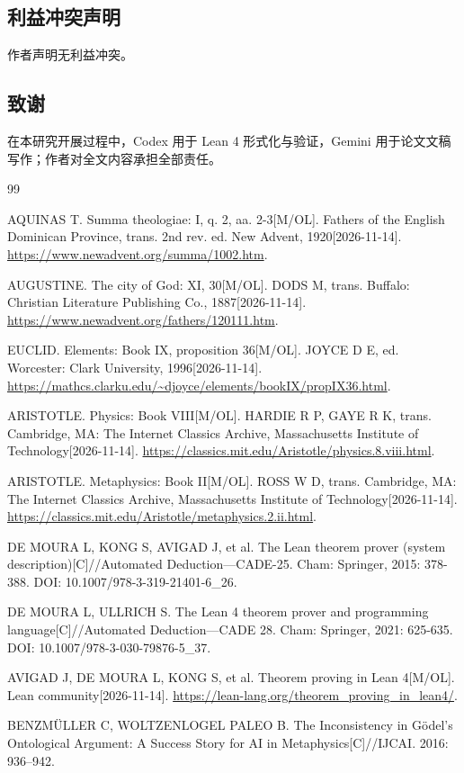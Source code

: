 \documentclass[11pt,a4paper]{ctexart}
\begin{document}
\subsection*{利益冲突声明}
作者声明无利益冲突。

\subsection*{致谢}
在本研究开展过程中，Codex 用于 Lean 4 形式化与验证，Gemini 用于论文文稿写作；作者对全文内容承担全部责任。

\begin{thebibliography}{99}

AQUINAS T. Summa theologiae: I, q. 2, aa. 2-3[M/OL]. Fathers of the English Dominican Province, trans. 2nd rev. ed. New Advent, 1920[2026-11-14]. \url{https://www.newadvent.org/summa/1002.htm}.

AUGUSTINE. The city of God: XI, 30[M/OL]. DODS M, trans. Buffalo: Christian Literature Publishing Co., 1887[2026-11-14]. \url{https://www.newadvent.org/fathers/120111.htm}.

EUCLID. Elements: Book IX, proposition 36[M/OL]. JOYCE D E, ed. Worcester: Clark University, 1996[2026-11-14]. \url{https://mathcs.clarku.edu/~djoyce/elements/bookIX/propIX36.html}.

ARISTOTLE. Physics: Book VIII[M/OL]. HARDIE R P, GAYE R K, trans. Cambridge, MA: The Internet Classics Archive, Massachusetts Institute of Technology[2026-11-14]. \url{https://classics.mit.edu/Aristotle/physics.8.viii.html}.

ARISTOTLE. Metaphysics: Book II[M/OL]. ROSS W D, trans. Cambridge, MA: The Internet Classics Archive, Massachusetts Institute of Technology[2026-11-14]. \url{https://classics.mit.edu/Aristotle/metaphysics.2.ii.html}.

DE MOURA L, KONG S, AVIGAD J, et al. The Lean theorem prover (system description)[C]//Automated Deduction---CADE-25. Cham: Springer, 2015: 378-388. DOI: 10.1007/978-3-319-21401-6\_26.

DE MOURA L, ULLRICH S. The Lean 4 theorem prover and programming language[C]//Automated Deduction---CADE 28. Cham: Springer, 2021: 625-635. DOI: 10.1007/978-3-030-79876-5\_37.

AVIGAD J, DE MOURA L, KONG S, et al. Theorem proving in Lean 4[M/OL]. Lean community[2026-11-14]. \url{https://lean-lang.org/theorem_proving_in_lean4/}.

BENZMÜLLER C, WOLTZENLOGEL PALEO B. The Inconsistency in Gödel’s Ontological Argument: A Success Story for AI in Metaphysics[C]//IJCAI. 2016: 936–942.
\end{thebibliography}
\end{document}
